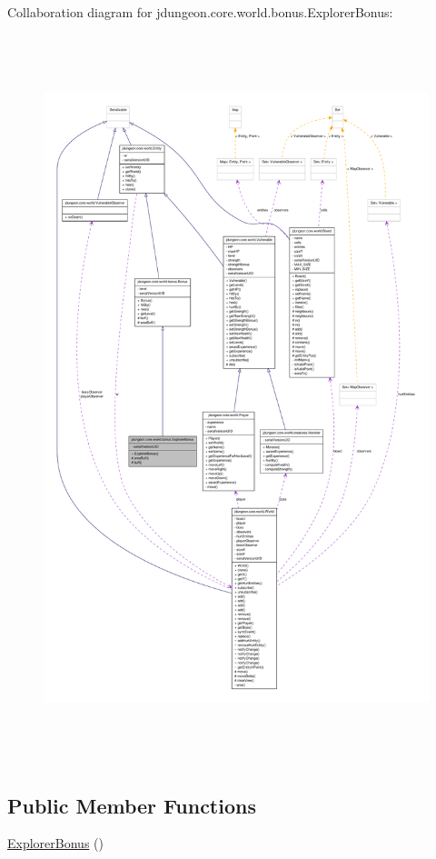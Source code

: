 Collaboration diagram for jdungeon.core.world.bonus.ExplorerBonus:
\nopagebreak
\begin{figure}[H]
\begin{center}
\leavevmode
\includegraphics[height=600pt]{classjdungeon_1_1core_1_1world_1_1bonus_1_1_explorer_bonus__coll__graph}
\end{center}
\end{figure}
\subsection*{Public Member Functions}
\begin{DoxyCompactItemize}
\item 
\hyperlink{classjdungeon_1_1core_1_1world_1_1bonus_1_1_explorer_bonus_afaf1d9440fe195d3c22036d2a790bf4a}{ExplorerBonus} ()
\end{DoxyCompactItemize}
